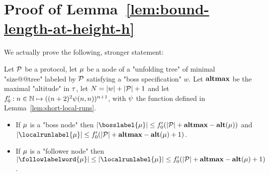 \section{Proof of Lemma~\ref{lem:bound-length-at-height-h}}
\label{app:bound-node-size-with-altitude}

\lemBoundLengthHeightH*

We actually prove the following, stronger statement:
\begin{lemma}
	\label{lem:bound-length-at-height-h-extended}
	Let $\mathcal{P}$ be a protocol, let $\mu$ be a node of a "unfolding tree" of minimal "size@@tree" labeled by $\mathcal{P}$ satisfying a "boss specification" $w$.
	Let $\mathbf{altmax}$ be the maximal "altitude" in $\tau$, let $N = |w| + |\mathcal{P}| +1$ and let $f_0' : n \in \mathbb{N} \mapsto ((n+2)^2 \psi(n,n))^{n+1}$, with $\psi$ the function defined in Lemma~\ref{lem:short-local-runs}.
	
	\begin{itemize}
		\item If $\mu$ is a "boss node" then $\size{\bosslabel{\node}} \leq f_0'(\size{\prot} +\altmax - \altitude{\node})$ and $\size{\localrunlabel{\node}} \leq f_0'(\size{\prot} +\altmax - \altitude{\node}+1)$.
		
		\item If $\mu$ is a "follower node" then $\size{\followlabelword{\node}} \leq \size{\localrunlabel{\node}} \leq f_0'(\size{\prot} + \altmax - \altitude{\node}+1)$.
	\end{itemize} 
\end{lemma}
